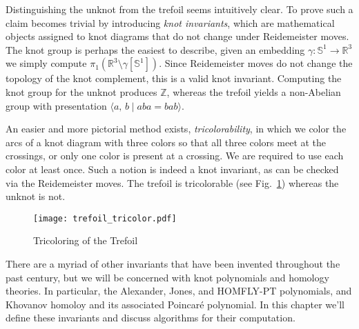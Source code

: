 Distinguishing the unknot from the trefoil seems intuitively clear. To prove
such a claim becomes trivial by introducing \textit{knot invariants}, which
are mathematical objects assigned to knot diagrams that do not change under
Reidemeister moves. The knot group is perhaps the easiest to describe, given
an embedding $\gamma:\mathbb{S}^{1}\rightarrow\mathbb{R}^{3}$ we simply
compute $\pi_{1}(\mathbb{R}^{3}\setminus\gamma[\mathbb{S}^{1}])$. Since
Reidemeister moves do not change the topology of the knot complement, this is
a valid knot invariant. Computing the knot group for the unknot produces
$\mathbb{Z}$, whereas the trefoil yields a non-Abelian group with presentation
$\langle{a,\,b}\;|\;aba=bab\rangle$.
\par\hfill\par
An easier and more pictorial method exists, \textit{tricolorability}, in which
we color the arcs of a knot diagram with three colors so that all three colors
meet at the crossings, or only one color is present at a crossing. We are
required to use each color at least once. Such a notion is indeed a knot
invariant, as can be checked via the Reidemeister moves. The trefoil is
tricolorable (see Fig.~\ref{fig:trefoil_tricolor}) whereas the unknot is not.
\par\hfill\par
\begin{figure}
    \centering
    \texttt{[image: trefoil\_tricolor.pdf]}
    \caption{Tricoloring of the Trefoil}
    \label{fig:trefoil_tricolor}
\end{figure}
There are a myriad of other invariants that have been invented throughout the
past century, but we will be concerned with knot polynomials and homology
theories. In particular, the Alexander, Jones, and HOMFLY-PT polynomials, and
Khovanov homoloy and its associated Poincar\'{e} polynomial. In this chapter
we'll define these invariants and discuss algorithms for their computation.
